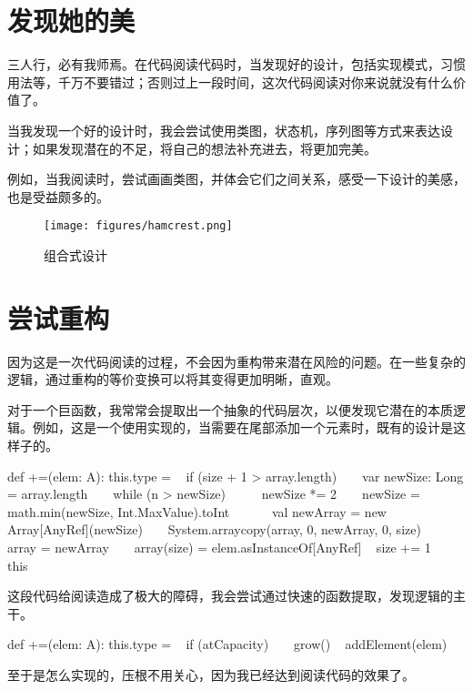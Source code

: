 \section{发现她的美}

\begin{content}

三人行，必有我师焉。在代码阅读代码时，当发现好的设计，包括实现模式，习惯用法等，千万不要错过；否则过上一段时间，这次代码阅读对你来说就没有什么价值了。

当我发现一个好的设计时，我会尝试使用类图，状态机，序列图等方式来表达设计；如果发现潜在的不足，将自己的想法补充进去，将更加完美。

例如，当我阅读时，尝试画画类图，并体会它们之间关系，感受一下设计的美感，也是受益颇多的。

\begin{figure}[!h]
\centering
\texttt{[image: figures/hamcrest.png]}
\caption{组合式设计}
 \label{fig:hamcrest}
\end{figure}

\end{content}

\section{尝试重构}

\begin{content}

因为这是一次代码阅读的过程，不会因为重构带来潜在风险的问题。在一些复杂的逻辑，通过重构的等价变换可以将其变得更加明晰，直观。

对于一个巨函数，我常常会提取出一个抽象的代码层次，以便发现它潜在的本质逻辑。例如，这是一个使用实现的，当需要在尾部添加一个元素时，既有的设计是这样子的。

\begin{leftbar}
\begin{python}
def +=(elem: A): this.type = {
  if (size + 1 > array.length) {
    var newSize: Long = array.length
    while (n > newSize)
      newSize *= 2
    newSize = math.min(newSize, Int.MaxValue).toInt
  
    val newArray = new Array[AnyRef](newSize)
    System.arraycopy(array, 0, newArray, 0, size)
    array = newArray
  }
  array(size) = elem.asInstanceOf[AnyRef]
  size += 1
  this
}
\end{python}
\end{leftbar}

这段代码给阅读造成了极大的障碍，我会尝试通过快速的函数提取，发现逻辑的主干。

\begin{leftbar}
\begin{python}
def +=(elem: A): this.type = {
  if (atCapacity)
    grow()
  addElement(elem)
}
\end{python}
\end{leftbar}

至于是怎么实现的，压根不用关心，因为我已经达到阅读代码的效果了。

\end{content}

